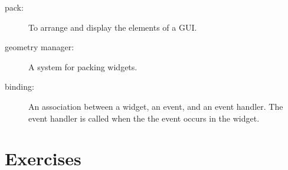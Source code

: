 \documentclass[10pt]{book}
\begin{document}
\begin{description}
\item[pack:] To arrange and display the elements of a GUI.

\item[geometry manager:] A system for packing widgets.

\item[binding:] An association between a widget, an event, and
an event handler.  The event handler is called when the the event
occurs in the widget.

\end{description}


\section{Exercises}
\end{document}
